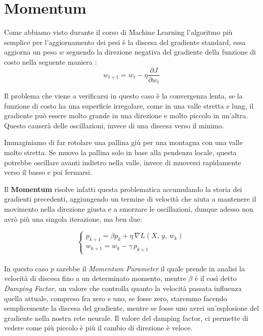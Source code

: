 \section{Momentum}
Come abbiamo visto durante il corso di Machine Learning l'algoritmo più semplice per l'aggiornamento dei pesi è la discesa del gradiente standard, essa aggiorna un peso $w$ seguendo la direzione negativa del gradiente della funzione di costo nella seguente maniera :
\begin{equation}
    w_{t+1} = w_t - \eta\frac{\partial J}{\partial w_t} 
\end{equation}

Il problema che viene a verificarsi in questo caso è la convergenza lenta, se la funzione di costo ha una superficie irregolare, come in una valle stretta e lung, il gradiente può essere molto grande in una direzione e molto piccolo in un'altra. Questo causerà delle oscillazioni, invece di una discesa verso il minimo.

\begin{Esempio}
    Immaginiamo di far rotolare una pallina giù per una montagna con una valle molto stretta. Se muovo la pallina solo in base alla pendenza locale, questa potrebbe oscillare avanti indietro nella valle, invece di muoversi rapidamente verso il basso e poi fermarsi.
\end{Esempio}

Il \textbf{Momentum} risolve infatti questa problematica accumulando la storia dei gradienti precedenti, aggiungendo un termine di velocità che aiuta a mantenere il movimento nella direzione giusta e a smorzare le oscillazioni, dunque adesso non avrò più una singola iterazione, ma ben due:

\begin{equation}
    \left\{\begin{array}{c}
    p_{k+1} = \beta p_k + \eta\,\nabla L(X,\,y,\,w_k)
    \\
    w_{k+1} = w_k - \gamma\,p_{k+1}
    \end{array}\right.
\end{equation}
\\
In questo caso $p$ sarebbe il \textit{Momentum Parameter} il quale prende in analisi la velocità di discesa fino a un determinato momento, mentre $\beta$ è il così detto \textit{Damping Factor}, un valore che controlla quanto la velocità passata influenza quella attuale, compreso fra zero e uno, se fosse zero, staremmo facendo semplicemente la discesa del gradiente, mentre se fosse uno avrei un'esplosione del gradiente nella nostra rete neurale. Il valore del damping factor, ci permette di vedere come più piccolo è più il cambio di direzione è veloce.

